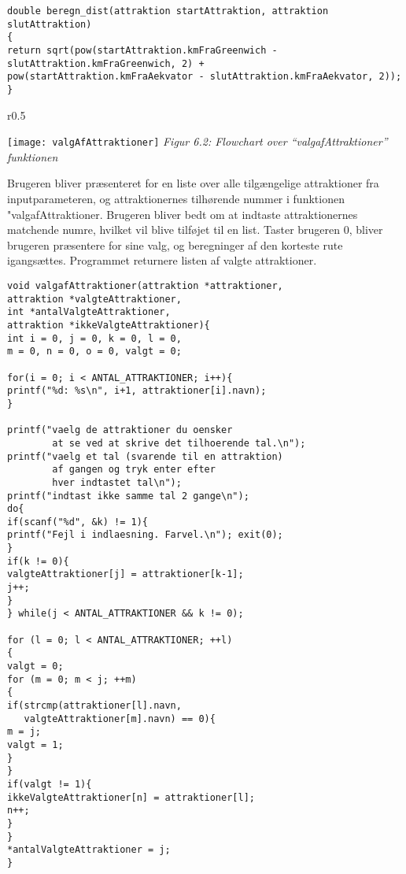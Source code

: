 \begin{lstlisting}
double beregn_dist(attraktion startAttraktion, attraktion slutAttraktion)
{
return sqrt(pow(startAttraktion.kmFraGreenwich - slutAttraktion.kmFraGreenwich, 2) + 
pow(startAttraktion.kmFraAekvator - slutAttraktion.kmFraAekvator, 2));
}
\end{lstlisting}

\begin{wrapfigure}{r}{0.5\textwidth}
	\vspace{0pt}
	\begin{center}
		\texttt{[image: valgAfAttraktioner]}\newline
		\textit{Figur 6.2: Flowchart over “valgafAttraktioner” funktionen}
	\end{center}
	\vspace{0pt}
	\vspace{0pt}
\end{wrapfigure}

Brugeren bliver præsenteret for en liste over alle tilgængelige attraktioner fra inputparameteren, og attraktionernes tilhørende nummer i funktionen "valgafAttraktioner. Brugeren bliver bedt om at indtaste attraktionernes matchende numre, hvilket vil blive tilføjet til en list. Taster brugeren 0, bliver brugeren præsentere for sine valg, og beregninger af den korteste rute igangsættes. Programmet returnere listen af valgte attraktioner. \newline

\begin{lstlisting}
void valgafAttraktioner(attraktion *attraktioner, 
attraktion *valgteAttraktioner, 
int *antalValgteAttraktioner, 
attraktion *ikkeValgteAttraktioner){
int i = 0, j = 0, k = 0, l = 0, 
m = 0, n = 0, o = 0, valgt = 0;

for(i = 0; i < ANTAL_ATTRAKTIONER; i++){
printf("%d: %s\n", i+1, attraktioner[i].navn);
}

printf("vaelg de attraktioner du oensker 
		at se ved at skrive det tilhoerende tal.\n");
printf("vaelg et tal (svarende til en attraktion) 
		af gangen og tryk enter efter 
		hver indtastet tal\n");
printf("indtast ikke samme tal 2 gange\n");
do{
if(scanf("%d", &k) != 1){
printf("Fejl i indlaesning. Farvel.\n"); exit(0);
}
if(k != 0){
valgteAttraktioner[j] = attraktioner[k-1];
j++;
}
} while(j < ANTAL_ATTRAKTIONER && k != 0);

for (l = 0; l < ANTAL_ATTRAKTIONER; ++l)
{
valgt = 0;
for (m = 0; m < j; ++m)
{
if(strcmp(attraktioner[l].navn, 
   valgteAttraktioner[m].navn) == 0){
m = j;
valgt = 1;
}	
}
if(valgt != 1){
ikkeValgteAttraktioner[n] = attraktioner[l];
n++;
}
}
*antalValgteAttraktioner = j;
}
\end{lstlisting}


